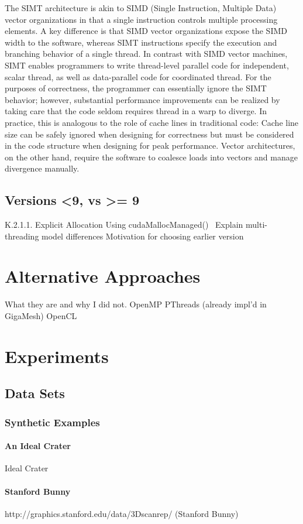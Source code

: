 \documentclass{article}
\begin{document}
The SIMT architecture is akin to SIMD (Single Instruction, Multiple Data) vector organizations in that a single instruction controls multiple processing elements. A key difference is that SIMD vector organizations expose the SIMD width to the software, whereas SIMT instructions specify the execution and branching behavior of a single thread. In contrast with SIMD vector machines, SIMT enables programmers to write thread-level parallel code for independent, scalar thread, as well as data-parallel code for coordinated thread. For the purposes of correctness, the programmer can essentially ignore the SIMT behavior; however, substantial performance improvements can be realized by taking care that the code seldom requires thread in a warp to diverge. In practice, this is analogous to the role of cache lines in traditional code: Cache line size can be safely ignored when designing for correctness but must be considered in the code structure when designing for peak performance. Vector architectures, on the other hand, require the software to coalesce loads into vectors and manage divergence manually.
\subsection{Versions <9, vs >= 9}
K.2.1.1. Explicit Allocation Using cudaMallocManaged()~\cite[p.~272]{CUDA18}
Explain multi-threading model differences
Motivation for choosing earlier version
\section{Alternative Approaches}
	What they are
and why I did not.
OpenMP
PThreads
(already impl’d in GigaMesh)
OpenCL
\section{Experiments}
\subsection{Data Sets}
\subsubsection{Synthetic Examples}
\paragraph{An Ideal Crater}
Ideal Crater
\paragraph{Stanford Bunny}
http://graphics.stanford.edu/data/3Dscanrep/ (Stanford Bunny)
\end{document}
